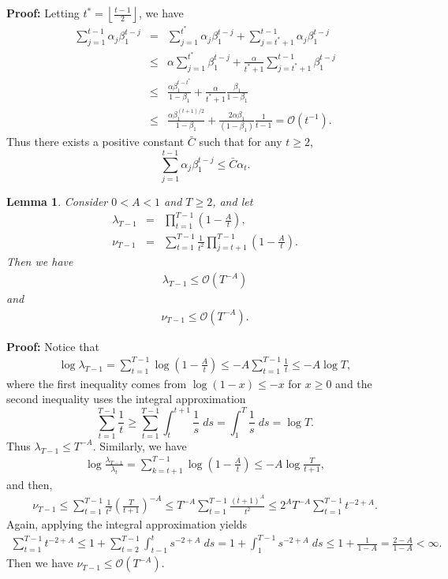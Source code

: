 \documentclass[twoside]{article}
\def\OO{\mathcal{O}}
\newtheorem{lemma}{Lemma}
\begin{document}
\textbf{Proof:} Letting $t^* =\left \lfloor\frac{t-1}{2}\right\rfloor$, we have
\begin{eqnarray}
\sum_{j=1}^{t-1} \alpha_j \beta_1^{t-j} &=& \sum_{j=1}^{t^*} \alpha_j \beta_1^{t-j} + \sum_{j=t^*+1}^{t-1} \alpha_j \beta_1^{t-j} \nonumber\\
&\leq& \alpha \sum_{j=1}^{t^*} \beta_1^{t-j} + \frac{\alpha}{t^* + 1} \sum_{j=t^*+1}^{t-1} \beta_1^{t-j} \nonumber \\
&\leq&  \frac{\alpha\beta_1^{t-t^*}}{1-\beta_1} + \frac{\alpha}{t^* + 1} \frac{\beta_1}{1-\beta_1} \nonumber\\
&\leq& \frac{\alpha \beta_1^{(t+1)/2}}{1-\beta_1} + \frac{2\alpha\beta_1}{(1-\beta_1)} \frac{1}{t-1} = \OO(t^{-1}).\nonumber
\end{eqnarray}
Thus there exists a positive constant $\bar C$ such that for any $t\geq 2$, 
$$\sum_{j=1}^{t-1} \alpha_j\beta_1^{t-j} \leq \bar C \alpha_t.$$

\begin{lemma}
\label{lem:Recursive}
Consider $0<A<1$ and $T\geq 2$, and let 
\begin{eqnarray}
\lambda_{T-1} &=& \prod_{t=1}^{T-1} \left(1-\frac{A}{t}\right),\nonumber\\
\nu_{T-1} &=& \sum_{t=1}^{T-1} \frac{1}{t^2} \prod_{j=t+1}^{T-1}\left(1-\frac{A}{t}\right).\nonumber
\end{eqnarray}
Then we have
\begin{eqnarray}
\lambda_{T-1} \leq \OO(T^{-A})\nonumber
\end{eqnarray}
and
\begin{eqnarray}
\nu_{T-1} \leq \OO(T^{-A}).\nonumber
\end{eqnarray}
\end{lemma}
\textbf{Proof:} Notice that
\begin{eqnarray}
\log \lambda_{T-1} = \sum_{t=1}^{T-1} \log\left(1-\frac{A}{t}\right)\leq -A\sum_{t=1}^{T-1}\frac{1}{t}\leq -A\log T,\nonumber
\end{eqnarray}
where the first inequality comes from $\log(1-x)\leq-x$ for $x\geq0$ and the second inequality uses the integral approximation
$$\sum_{t=1}^{T-1}\frac{1}{t} \geq \sum_{t=1}^{T-1}\int_{t}^{t+1} \frac{1}{s}\;ds =\int_{1}^T \frac{1}{s}\;ds=\log T.$$
Thus $
\lambda_{T-1} \leq T^{-A}. $
Similarly, we have
\begin{eqnarray}
\log \frac{\lambda_{T-1}}{\lambda_t} = \sum_{k={t+1}}^{T-1} \log\left( 1- \frac{A}{t}\right)\leq - A\log\frac{T}{t+1},\nonumber
\end{eqnarray}
and then,
\begin{eqnarray}
\nu_{T-1} \leq \sum_{t=1}^{T-1} \frac{1}{t^2} \left(\frac{T}{t+1}\right)^{-A} \leq  T^{-A}\sum_{t=1}^{T-1} \frac{(t+1)^{A}}{t^2}\leq  2^{A} T^{-A} \sum_{t=1}^{T-1} t^{-2+A} .\nonumber
\end{eqnarray}
Again, applying the integral approximation yields
\begin{eqnarray}
\sum_{t=1}^{T-1} t^{-2+A} \leq 1 + \sum_{t=2}^{T-1}\int_{t-1}^t s^{-2+A}\;ds = 1+\int_{1}^{T-1} s^{-2+A}\;ds\leq 1 + \frac{1}{1-A} = \frac{2-A}{1-A}<\infty.\nonumber
\end{eqnarray}
Then we have $\nu_{T-1} \leq \OO( T^{-A}).$
\end{document}
